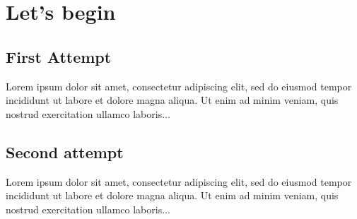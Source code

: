 \documentclass[a4paper,12pt]{book}
\begin{document}
	\chapter{Let's begin}
	\section{First Attempt}
	
	Lorem ipsum dolor sit amet, consectetur adipiscing elit, sed do 
	eiusmod tempor incididunt ut labore et dolore magna aliqua. Ut 
	enim ad minim veniam, quis nostrud exercitation ullamco laboris...
	
	\section{Second attempt}
	
	Lorem ipsum dolor sit amet, consectetur adipiscing elit, sed do 
	eiusmod tempor incididunt ut labore et dolore magna aliqua. Ut 
	enim ad minim veniam, quis nostrud exercitation ullamco laboris...
	
\end{document}
